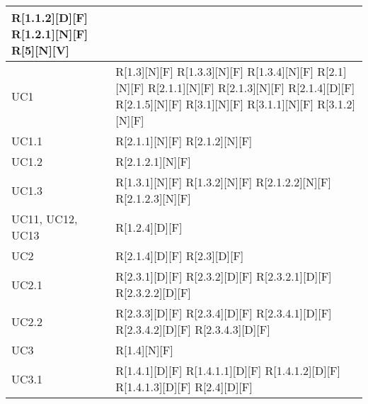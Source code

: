 \begin{longtable}{X | X}
R[1.1.2][D][F] \newline
R[1.2.1][N][F] \newline
R[5][N][V]  \\
\hline
UC1 & R[1.3][N][F] \newline
R[1.3.3][N][F] \newline
R[1.3.4][N][F] \newline
R[2.1][N][F] \newline
R[2.1.1][N][F] \newline
R[2.1.3][N][F] \newline
R[2.1.4][D][F] \newline
R[2.1.5][N][F] \newline
R[3.1][N][F] \newline
R[3.1.1][N][F] \newline
R[3.1.2][N][F]  \\
\hline
UC1.1 & R[2.1.1][N][F] \newline
R[2.1.2][N][F]  \\
\hline
UC1.2 & R[2.1.2.1][N][F]  \\
\hline
UC1.3 & R[1.3.1][N][F] \newline
R[1.3.2][N][F] \newline
R[2.1.2.2][N][F] \newline
R[2.1.2.3][N][F]  \\
\hline
UC11, UC12, UC13 & R[1.2.4][D][F]  \\
\hline
UC2 & R[2.1.4][D][F] \newline
R[2.3][D][F]  \\
\hline
UC2.1 & R[2.3.1][D][F] \newline
R[2.3.2][D][F] \newline
R[2.3.2.1][D][F] \newline
R[2.3.2.2][D][F]  \\
\hline
UC2.2 & R[2.3.3][D][F] \newline
R[2.3.4][D][F] \newline
R[2.3.4.1][D][F] \newline
R[2.3.4.2][D][F] \newline
R[2.3.4.3][D][F]  \\
\hline
UC3 & R[1.4][N][F]  \\
\hline
UC3.1 & R[1.4.1][D][F] \newline
R[1.4.1.1][D][F] \newline
R[1.4.1.2][D][F] \newline
R[1.4.1.3][D][F] \newline
R[2.4][D][F] \newline

\end{longtable}
